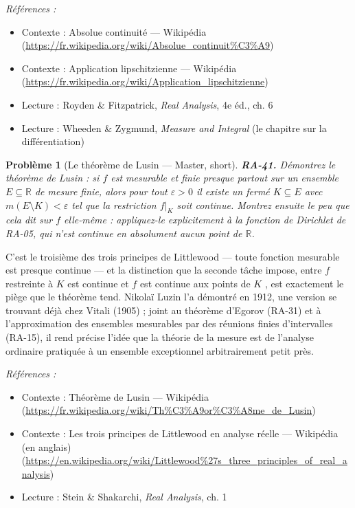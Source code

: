 \documentclass[11pt]{article}
\newtheorem{problem}{Problème}
\newenvironment{refs}{\par\small\noindent\emph{Références :}\begin{itemize}\setlength\itemsep{0pt}}{\end{itemize}\normalsize}
\begin{document}
\begin{refs}
\item Contexte : Absolue continuité --- Wikipédia (\url{https://fr.wikipedia.org/wiki/Absolue_continuit%C3%A9})
\item Contexte : Application lipschitzienne --- Wikipédia (\url{https://fr.wikipedia.org/wiki/Application_lipschitzienne})
\item Lecture : Royden \& Fitzpatrick, \textit{Real Analysis}, 4e éd., ch. 6
\item Lecture : Wheeden \& Zygmund, \textit{Measure and Integral} (le chapitre sur la différentiation)
\end{refs}

\bigskip

\begin{problem}[{Le théorème de Lusin --- Master, short}]
\textbf{RA-41.} Démontrez le théorème de Lusin : si $ f $ est mesurable et
finie presque partout sur un ensemble $ E \subseteq \mathbb{R} $ de mesure finie, alors pour tout
$ \varepsilon > 0 $ il existe un fermé $ K \subseteq E $ avec
$ m(E \setminus K) < \varepsilon $ tel que la restriction $ f|_K $ soit continue. Montrez
ensuite le peu que cela dit sur $ f $ elle-même : appliquez-le explicitement à la fonction de
Dirichlet de RA-05, qui n'est continue en absolument aucun point de $ \mathbb{R} $.
\end{problem}

\noindent C'est le troisième des trois principes de Littlewood --- toute fonction mesurable
est presque continue --- et la distinction que la seconde tâche impose, entre \og{} $ f $ restreinte à
$ K $ est continue \fg{} et \og{} $ f $ est continue aux points de $ K $ \fg{}, est exactement le piège
que le théorème tend. Nikolaï Luzin l'a démontré en 1912, une version se trouvant déjà chez Vitali
(1905) ; joint au théorème d'Egorov (RA-31) et à l'approximation des ensembles mesurables par des
réunions finies d'intervalles (RA-15), il rend précise l'idée que la théorie de la mesure est de
l'analyse ordinaire pratiquée à un ensemble exceptionnel arbitrairement petit près.

\begin{refs}
\item Contexte : Théorème de Lusin --- Wikipédia (\url{https://fr.wikipedia.org/wiki/Th%C3%A9or%C3%A8me_de_Lusin})
\item Contexte : Les trois principes de Littlewood en analyse réelle --- Wikipédia (en anglais) (\url{https://en.wikipedia.org/wiki/Littlewood%27s_three_principles_of_real_analysis})
\item Lecture : Stein \& Shakarchi, \textit{Real Analysis}, ch. 1
\end{refs}
\end{document}
